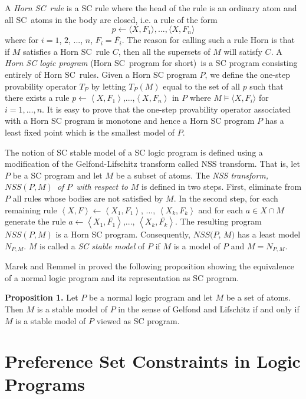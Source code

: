 \documentclass[letterpaper]{article}\usepackage{aaai}
\begin{document}
A \emph{Horn SC\ rule} is a SC rule where the head of the rule is an ordinary
atom and all SC\ atoms in the body are closed, i.e. a rule of the form
\[
p\leftarrow\langle X,F_{1}\rangle,...,\langle X,F_{n}\rangle
\]
where for $i=1$, $2$, ..., $n$, $F_{i}=\overline{F_{i}}$. The reason for
calling such a rule Horn is that if $M$ satisfies a Horn SC\ rule $C$, then
all the supersets of $M$ will satisfy $C$. A \emph{Horn SC logic program}
(Horn SC\ program for short)\ is a SC program consisting entirely of Horn
SC\ rules. Given a Horn SC program $P$, we define the one-step provability
operator $T_{P}$ by letting $T_{P}(M)$ equal to the set of all $p$ such that
there exists a rule $p\leftarrow\left\langle X,F_{1}\right\rangle
$,...,$\left\langle X,F_{n}\right\rangle $ in $P$ where $M\models\langle
X,F_{i}\rangle$ for $i=1,\ldots,n$. It is easy to prove that the one-step
provability operator associated with a Horn SC program is monotone and hence a
Horn SC program $P$ has a least fixed point which is the smallest model of $P$.

The notion of SC stable model of a SC logic program is defined using a
modification of the Gelfond-Lifschitz transform called NSS transform. That is,
let $P$ be a SC program and let $M$ be a subset of atoms. The \emph{NSS
transform, }$NSS\left(  P,M\right)  $\emph{\ of }$P$\emph{\ with respect to
}$M $ is defined in two steps. First, eliminate from $P$ all rules whose
bodies are not satisfied by $M$. In the second step, for each remaining rule
$\left\langle X,F\right\rangle \leftarrow\left\langle X_{1},F_{1}\right\rangle
$, ..., $\left\langle X_{k},F_{k}\right\rangle $ and for each $a\in X\cap M$
generate the rule $a\leftarrow\left\langle X_{1},\overline{F_{1}}\right\rangle
$,..., $\left\langle X_{k},\overline{F_{k}}\right\rangle .$ The resulting
program $NSS\left(  P,M\right)  $ is a Horn SC program. Consequently, $NSS(P$,
$M)$ has a least model $N_{P,M}$. $M$ is called a \emph{SC stable model} of
$P$ if $M$ is a model of $P$ and $M=N_{P,M}$.

Marek and Remmel in \cite{MR} proved the following proposition showing the
equivalence of a normal logic program and its representation as SC program.

\textbf{Proposition 1.} Let $P$ be a normal logic program and let $M$ be a set
of atoms. Then $M$ is a stable model of $P$ in the sense of Gelfond and
Lifschitz if and only if $M$ is a stable model of $P$ viewed as SC program.

\section{Preference Set Constraints in Logic Programs}
\end{document}
